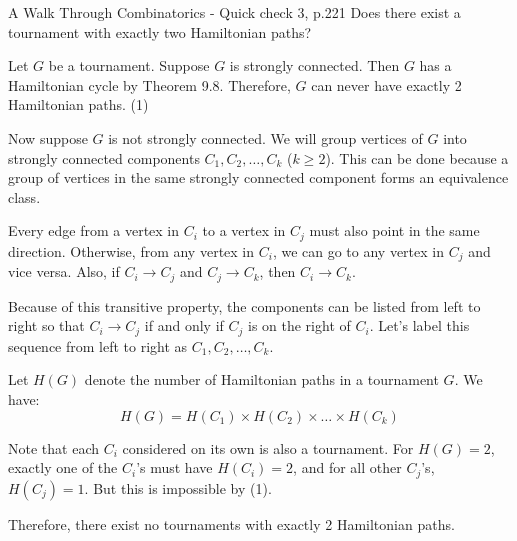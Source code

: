 \begin{problem}{}{}{A Walk Through Combinatorics - Quick check 3, p.221}
Does there exist a tournament with exactly two Hamiltonian paths?
\end{problem}

\begin{solution}
Let $G$ be a tournament. Suppose $G$ is strongly connected. 
Then $G$ has a Hamiltonian cycle by Theorem 9.8. 
Therefore, $G$ can never have exactly 2 Hamiltonian paths. (1)

Now suppose $G$ is not strongly connected. 
We will group vertices of $G$ into strongly connected components 
$C_1, C_2, \dots, C_k$ ($k \geq 2$). 
This can be done because a group of vertices in the same 
strongly connected component forms an equivalence class. 

Every edge from a vertex in $C_i$ to a vertex in $C_j$ 
must also point in the same direction. 
Otherwise, from any vertex in $C_i$, we can go to any vertex 
in $C_j$ and vice versa. 
Also, if $C_i \to C_j$ and $C_j \to C_k$, then $C_i \to C_k$. 

Because of this transitive property, the components can be 
listed from left to right so that $C_i \to C_j$ if and only if 
$C_j$ is on the right of $C_i$. 
Let's label this sequence from left to right as $C_1, C_2, \dots, C_k$. 

Let $H(G)$ denote the number of Hamiltonian paths in a tournament $G$. 
We have:
$$H(G) = H(C_1) \times H(C_2) \times \dots \times H(C_k)$$

Note that each $C_i$ considered on its own is also a tournament. 
For $H(G) = 2$, exactly one of the $C_i$'s must have $H(C_i) = 2$, 
and for all other $C_j$'s, $H(C_j) = 1$. 
But this is impossible by (1).

Therefore, there exist no tournaments with exactly 2 Hamiltonian paths.
\end{solution}